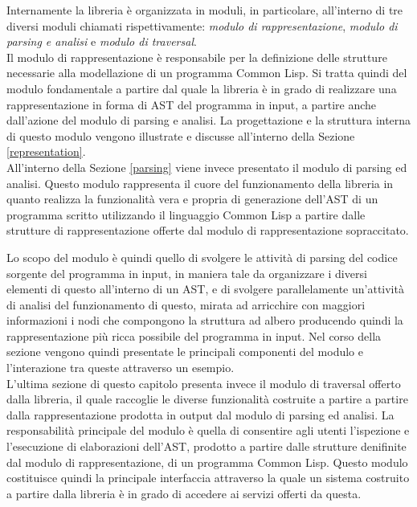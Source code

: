 \documentclass{book}
\begin{document}
Internamente la libreria è organizzata in moduli, in particolare, all'interno di
tre diversi moduli chiamati rispettivamente: \textit{modulo di
rappresentazione}, \textit{modulo di parsing e analisi} e \textit{modulo di
traversal}.\\

Il modulo di rappresentazione è responsabile per la definizione delle strutture
necessarie alla modellazione di un programma Common Lisp. Si tratta quindi del
modulo fondamentale a partire dal quale la libreria è in grado di realizzare una
rappresentazione in forma di AST del programma in input, a partire anche
dall'azione del modulo di parsing e analisi. La progettazione e la struttura
interna di questo modulo vengono illustrate e discusse all'interno della Sezione
\ref{representation}.\\

All'interno della Sezione \ref{parsing} viene invece presentato il modulo di
parsing ed analisi. Questo modulo rappresenta il cuore del funzionamento della
libreria in quanto realizza la funzionalità vera e propria di generazione
dell'AST di un programma scritto utilizzando il linguaggio Common Lisp a partire
dalle strutture di rappresentazione offerte dal modulo di rappresentazione
sopraccitato.

Lo scopo del modulo è quindi quello di svolgere le attività di parsing del
codice sorgente del programma in input, in maniera tale da organizzare i diversi
elementi di questo all'interno di un AST, e di svolgere parallelamente
un'attività di analisi del funzionamento di questo, mirata ad arricchire con
maggiori informazioni i nodi che compongono la struttura ad albero producendo
quindi la rappresentazione più ricca possibile del programma in input. Nel corso
della sezione vengono quindi presentate le principali componenti del modulo e
l'interazione tra queste attraverso un esempio.\\

L'ultima sezione di questo capitolo presenta invece il modulo di traversal
offerto dalla libreria, il quale raccoglie le diverse funzionalità costruite a
partire a partire dalla rappresentazione prodotta in output dal modulo di
parsing ed analisi. La responsabilità principale del modulo è quella di
consentire agli utenti l'ispezione e l'esecuzione di elaborazioni dell'AST,
prodotto a partire dalle strutture denifinite dal modulo di rappresentazione, di
un programma Common Lisp. Questo modulo costituisce quindi la principale
interfaccia attraverso la quale un sistema costruito a partire dalla libreria è
in grado di accedere ai servizi offerti da questa.
\end{document}
